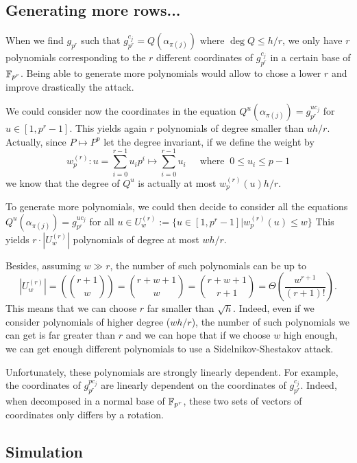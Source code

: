 \documentclass[12pt,a4paper,titlepage]{article}
\begin{document}
\subsection{Generating more rows...}
When we find $g_{p^r}$ such that $g_{p^r}^{c_j} = Q(\alpha_{\pi(j)})$ where $\deg Q \leq h/r$, we only have $r$ polynomials corresponding to the $r$ different coordinates of $g_{p^r}^{c_j}$ in a certain base of $\mathbb{F}_{p^r}$. Being able to generate more polynomials would allow to chose a lower $r$ and improve drastically the attack.

We could consider now the coordinates in the equation $Q^u(\alpha_{\pi(j)}) = g_{p^r}^{u c_j}$ for $u \in [1,p^r-1]$. This yields again $r$ polynomials of degree smaller than $u h/r$. Actually, since $P \mapsto P^p$ let the degree invariant, if we define the weight by
$$ w_p^{(r)} : u = \sum_{i=0}^{r-1} u_i p^i \longmapsto \sum_{i=0}^{r-1} u_i \ \ \ \ \ \text{ where }  \ 0 \leq u_i \leq p-1 $$
we know that the degree of $Q^u$ is actually at most $w_p^{(r)}(u) h / r$.

To generate more polynomials, we could then decide to consider all the equations $Q^u(\alpha_{\pi(j)}) = g_{p^r}^{u c_j}$ for all $u \in U_w^{(r)} := \{ u \in [1,p^r-1] | w_p^{(r)}(u) \leq w \}$
This yields $r \cdot |U_w^{(r)}|$ polynomials of degree at most $wh/r$.

Besides, assuming $w \gg r$, the number of such polynomials can be up to
$$ | U_w^{(r)} | = \left( \binom{r+1}{w} \right) = \binom{r+w+1}{w} = \binom{r+w+1}{r+1} = \Theta\left(\frac{w^{r+1}}{(r+1)!}\right) .$$
This means that we can choose $r$ far smaller than $\sqrt{h}$. Indeed, even if we consider polynomials of higher degree ($wh/r$), the number of such polynomials we can get is far greater than $r$ and we can hope that if we choose $w$ high enough, we can get enough different polynomials to use a Sidelnikov-Shestakov attack.


Unfortunately, these polynomials are strongly linearly dependent.
For example, the coordinates of $g_{p^r}^{p c_j}$ are linearly dependent on the coordinates of $g_{p^r}^{c_j}$. Indeed, when decomposed in a normal base of $\mathbb{F}_{p^r}$, these two sets of vectors of coordinates only differs by a rotation.


\subsection{Simulation}
\end{document}

